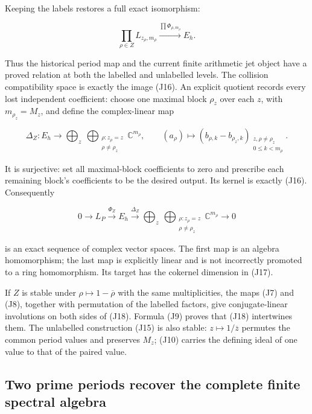 Keeping the labels restores a full exact isomorphism:

\[
\prod_{\rho\in Z}L_{z_\rho,m_\rho}
\xrightarrow{\prod\Phi_{\rho,m_\rho}}
E_h.
\tag{J18}
\]

Thus the historical period map and the current finite arithmetic jet object have a proved relation at both the labelled and unlabelled levels. The collision compatibility space is exactly the image (J16). An explicit quotient records every lost independent coefficient: choose one maximal block \(\rho _z\) over each \(z\), with \(m_{\rho _z}=M_z\), and define the complex-linear map

\[
\Delta_Z:E_h\longrightarrow
\bigoplus_z\ \bigoplus_{\substack{\rho:z_\rho=z\\\rho\ne\rho_z}}
\mathbb C^{m_\rho},\qquad
(a_\rho)\longmapsto
\left(b_{\rho,k}-b_{\rho_z,k}\right)_{
\substack{z,\rho\ne\rho_z\\0\le k<m_\rho}}.
\tag{J19}
\]

It is surjective: set all maximal-block coefficients to zero and prescribe each remaining block's coefficients to be the desired output. Its kernel is exactly (J16). Consequently

\[
0\longrightarrow L_P\xrightarrow{\Phi_Z}E_h
\xrightarrow{\Delta_Z}
\bigoplus_z\ \bigoplus_{\substack{\rho:z_\rho=z\\\rho\ne\rho_z}}
\mathbb C^{m_\rho}\longrightarrow0
\tag{J20}
\]

is an exact sequence of complex vector spaces. The first map is an algebra homomorphism; the last map is explicitly linear and is not incorrectly promoted to a ring homomorphism. Its target has the cokernel dimension in (J17).

If \(Z\) is stable under \(\rho\longmapsto1-\overline\rho\) with the same multiplicities, the maps (J7) and (J8), together with permutation of the labelled factors, give conjugate-linear involutions on both sides of (J18). Formula (J9) proves that (J18) intertwines them. The unlabelled construction (J15) is also stable: \(z\longmapsto1/\overline z\) permutes the common period values and preserves \(M_z\); (J10) carries the defining ideal of one value to that of the paired value.

\subsection{Two prime periods recover the complete finite spectral algebra}
\label{sec:two-prime-complete-jets}

